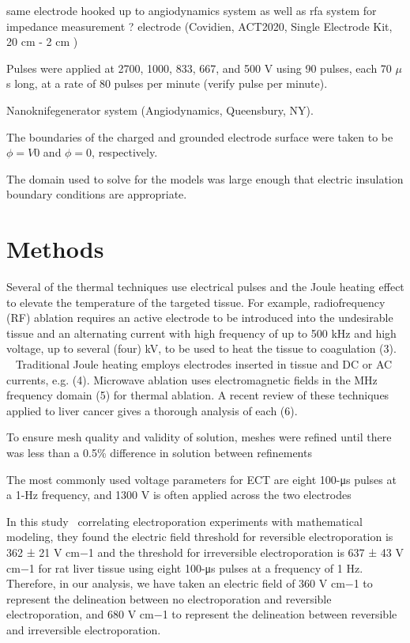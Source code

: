 \documentclass{article}
\begin{document}
 
same electrode hooked up to angiodynamics system as well as rfa system for
impedance measurement ? 
electrode (Covidien, ACT2020, Single Electrode Kit, 20 cm - 2 cm )

Pulses were applied at
2700, 1000, 833, 667, and 500 V
using 90 pulses, each 70 $\mu$s long, at a rate of 80 pulses per minute
({\color{red}verify pulse per minute}).

Nanoknife\textregistered generator system (Angiodynamics, Queensbury, NY).

The boundaries
of the charged and grounded electrode surface were taken to
be $\phi=V0$ and $\phi=0$, respectively.

The domain used to solve for the models was large enough that electric
insulation boundary conditions are appropriate. 



\section{Methods}


{\color{red}
Several of the thermal techniques
use electrical pulses and the Joule heating effect to elevate the
temperature of
the targeted tissue. For example, radiofrequency (RF) ablation requires an
active electrode to be introduced into the undesirable tissue and an
alternating
current with high frequency of up to 500 kHz and high voltage, up to several
(four) kV, to be used to heat the tissue to coagulation (3). ~\cite{Davalos2005}
Traditional Joule heating
employs electrodes inserted in tissue and DC or AC currents, e.g. (4).
Microwave ablation uses electromagnetic fields in the MHz frequency domain
(5) for thermal ablation. A recent review of these techniques applied to
liver
cancer gives a thorough analysis of each (6).


To ensure mesh quality and validity of solution,
meshes were refined until there was less than a 0.5\% difference
in solution between refinements


The most commonly
used voltage parameters for ECT are eight 100-μs
pulses at a 1-Hz frequency, and 1300 V is often applied
across the two electrodes


In this study~\cite{Miklavcic2000} correlating electroporation experiments with
mathematical modeling, they found the electric field threshold
for reversible electroporation is 362 ± 21 V cm−1 and
the threshold for irreversible electroporation is 637 ± 43 V
cm−1 for rat liver tissue using eight 100-μs pulses at a frequency
of 1 Hz. Therefore, in our analysis, we have taken
an electric field of 360 V cm−1 to represent the delineation
between no electroporation and reversible electroporation,
and 680 V cm−1 to represent the delineation between reversible
and irreversible electroporation.

}
\end{document}
